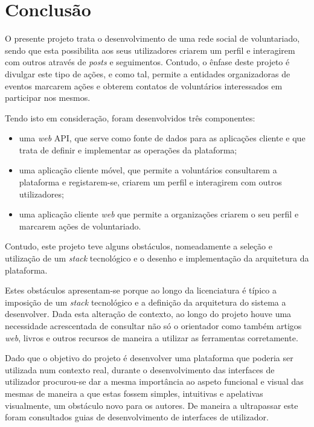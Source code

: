 \section{Conclusão}

O presente projeto trata o desenvolvimento de uma rede social de voluntariado, sendo que esta possibilita aos seus utilizadores criarem um perfil e interagirem com outros através de \textit{posts} e seguimentos. Contudo, o ênfase deste projeto é divulgar este tipo de ações, e como tal, permite a entidades organizadoras de eventos marcarem ações e obterem contatos de voluntários interessados em participar nos mesmos.

\par \medskip

Tendo isto em consideração, foram desenvolvidos três componentes:

\begin{itemize}
	\item uma \textit{web} API, que serve como fonte de dados para as aplicações cliente e que trata de definir e implementar as operações da plataforma;
	\item uma aplicação cliente móvel, que permite a voluntários consultarem a plataforma e registarem-se, criarem um perfil e interagirem com outros utilizadores;
	\item uma aplicação cliente \textit{web} que permite a organizações criarem o seu perfil e marcarem ações de voluntariado.
\end{itemize}

Contudo, este projeto teve alguns obstáculos, nomeadamente a seleção e utilização de um \textit{stack} tecnológico e o desenho e implementação da arquitetura da plataforma.

\par \medskip

Estes obstáculos apresentam-se porque ao longo da licenciatura é típico a imposição de um \textit{stack} tecnológico e a definição da arquitetura do sistema a desenvolver. Dada esta alteração de contexto, ao longo do projeto houve uma necessidade acrescentada de consultar não só o orientador como também artigos \textit{web}, livros e outros recursos de maneira a utilizar as ferramentas corretamente.

\par \medskip

Dado que o objetivo do projeto é desenvolver uma plataforma que poderia ser utilizada num contexto real, durante o desenvolvimento das interfaces de utilizador procurou-se dar a mesma importância ao aspeto funcional e visual das mesmas de maneira a que estas fossem simples, intuitivas e apelativas visualmente, um obstáculo novo para os autores. De maneira a ultrapassar este foram consultados guias de desenvolvimento de interfaces de utilizador.

